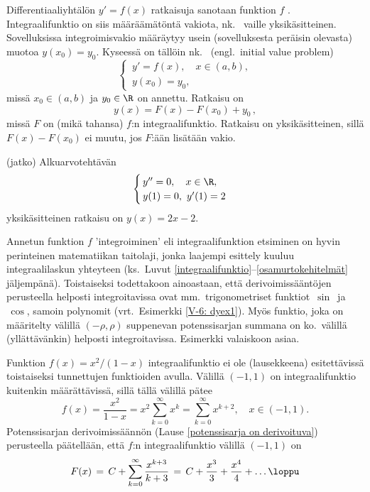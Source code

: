 Differentiaaliyhtälön $y'=f(x)$ ratkaisuja sanotaan funktion $f$ .
Integraalifunktio on siis määräämätöntä vakiota, nk.\ 
%
 vaille
yksikäsitteinen. Sovelluksissa integroimisvakio määräytyy usein (sovelluksesta peräisin
olevasta) 
 muotoa $y(x_0)=y_0$. Kyseessä on tällöin nk.\ 
(engl.\ initial value problem)
\[ \begin{cases}
   \,y'=f(x), \quad x\in(a,b), \\ \,y(x_0)=y_0,
   \end{cases} \]
missä $x_0\in(a,b)$ ja $y_0\in\R$ on annettu. Ratkaisu on
\[
y(x)=F(x)-F(x_0)+y_0\,,
\]
missä $F$ on (mikä tahansa) $f$:n integraalifunktio. Ratkaisu on yksikäsitteinen, sillä
$F(x)-F(x_0)$ ei muutu, jos $F$:ään lisätään vakio.
\jatko \begin{Exa} (jatko) Alkuarvotehtävän
\[ \begin{cases}
   \,y''=0, \quad x\in\R, \\ \,y(1)=0,\ y'(1)=2
   \end{cases} \]
yksikäsitteinen ratkaisu on $y(x)=2x-2$. \loppu
\end{Exa}

Annetun funktion $f$ 'integroiminen' eli integraalifunktion etsiminen on hyvin perinteinen
matematiikan taitolaji, jonka laajempi esittely kuuluu integraalilaskun yhteyteen
(ks.\ Luvut \ref{integraalifunktio}--\ref{osamurtokehitelmät} jäljempänä). Toistaiseksi
todettakoon ainoastaan, että derivoimissääntöjen perusteella helposti integroitavissa
ovat mm.\ trigonometriset funktiot $\,\sin\,$ ja $\,\cos$, samoin polynomit (vrt.\ Esimerkki
\ref{V-6: dyex1}). Myös funktio, joka on määritelty välillä $(-\rho,\rho)$ suppenevan
potenssisarjan summana on ko.\ välillä (yllättävänkin) helposti integroitavissa. Esimerkki
valaiskoon asiaa.
\begin{Exa} Funktion $f(x)=x^2/(1-x)$ integraalifunktio ei ole (lausekkeena) esitettävissä
toistaiseksi tunnettujen funktioiden avulla. Välillä $(-1,1)$ on integraalifunktio
kuitenkin määrättävissä, sillä tällä välillä pätee
\[
f(x)=\frac{x^2}{1-x}=x^2\sum_{k=0}^\infty x^k=\sum_{k=0}^\infty x^{k+2}, \quad x\in(-1,1).
\]
Potenssisarjan derivoimissäännön (Lause \ref{potenssisarja on derivoituva}) perusteella
päätellään, että $f$:n integraalifunktio välillä $(-1,1)$ on
\[
F(x)\,=\,C+\sum_{k=0}^\infty \frac{x^{k+3}}{k+3}\,
      =\,C+\frac{x^3}{3}+\frac{x^4}{4}+ \ldots \loppu
\]
\end{Exa}

